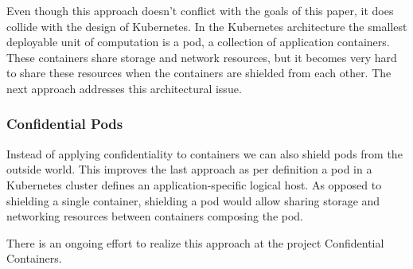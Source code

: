 
Even though this approach doesn't conflict with the goals of this paper, it does
collide with the design of Kubernetes. In the Kubernetes architecture the
smallest deployable unit of computation is a pod, a collection of application
containers. These containers share storage and network resources, but it becomes
very hard to share these resources when the containers are shielded from each
other. The next approach addresses this architectural issue.

\subsubsection{Confidential Pods}
\label{sec:confidential-applications}

Instead of applying confidentiality to containers we can also shield pods from
the outside world. This improves the last approach as per definition a pod in a
Kubernetes cluster defines an application-specific logical host. As opposed to
shielding a single container, shielding a pod would allow sharing storage and
networking resources between containers composing the pod.

There is an ongoing effort to realize this approach at the project Confidential
Containers.

